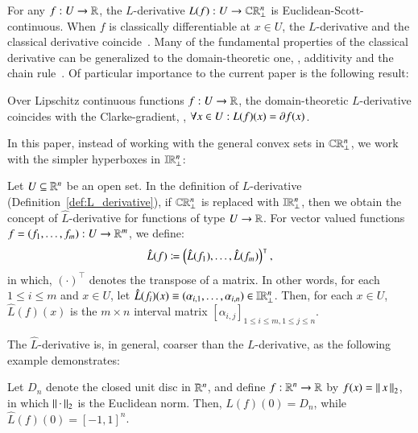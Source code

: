 \documentclass[11pt,times]{article}
\begin{document}
For any $f: U \to \R$, the $L$-derivative
$L(f): U \to \cCPPO{\R^n\lift}$ is Euclidean-Scott-continuous. When
$f$ is classically differentiable at $x \in U$, the $L$-derivative and
the classical derivative
coincide~\parencite{Edalat:2008:Continuous_Derivative}. Many of the
fundamental properties of the classical derivative can be generalized
to the domain-theoretic one, {\eg}, additivity and the chain
rule~\parencite{Edalat_Pattinson:2005:Inverse_Implicit}. Of particular
importance to the current paper is the following result:
%
\begin{theorem}
\label{thm:L_deriv_Clarke_coincide}
  Over Lipschitz continuous functions $f: U \to \R$, the
  domain-theoretic $L$-derivative coincides with the Clarke-gradient,
  {\ie}, $\forall x \in U: L(f)(x) = \clarke{f}(x)$. 
\end{theorem}

In this paper, instead of working with the general convex sets in
$\cCPPO{\R^n\lift}$, we work with the simpler hyperboxes in
$\intvaldom[\R^n\lift]$:
%
\begin{definition}
  \label{def:Lhat_derivative}
  Let $U \subseteq \R^n$ be an open set. In the definition of
  $L$-derivative (Definition~\ref{def:L_derivative}), if
  $\cCPPO{\R^n\lift}$ is replaced with $\intvaldom[\R^n\lift]$, then
  we obtain the concept of $\hat{L}$-derivative for functions of type
  $U \to \R$. For vector valued functions
  $f = ( f_1, \ldots, f_m): U \to \R^m$, we define:
  \begin{equation*}
    \hat{L}(f) \defeq  \left( \hat{L}(f_1),  \ldots, \hat{L}(f_m)
    \right)^\intercal,
  \end{equation*}
  in which, $(\cdot)^\intercal$ denotes the transpose of a matrix. In
  other words, for each $1 \leq i \leq m$ and $x \in U$, let
  $\hat{L}(f_i)(x) \equiv ( \alpha_{i,1}, \ldots, \alpha_{i,n}) \in \intvaldom[\R^n\lift]$. Then, for
  each $x \in U$, $\hat{L}(f)(x)$ is the $m \times n$ interval matrix
  $[\alpha_{i,j}]_{1 \leq i \leq m, 1 \leq j \leq n}$.
\end{definition}



The $\hat{L}$-derivative is, in general, coarser than the
$L$-derivative, as the following example demonstrates:
%
\begin{example}
  \label{example:L_hat_overapprox_L_derive}
  Let $D_n$ denote the closed unit disc in $\R^n$, and define
  $f: \R^n \to \R$ by $f(x) = \norm{x}_2$, in which $\norm{\cdot}_2$
  is the Euclidean norm. Then, $L(f)(0) = D_n$, while
  $\hat{L}(f)(0) = [-1,1]^n$.
\end{example}
%
\end{document}
